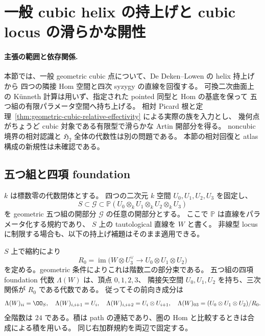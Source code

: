 \section{一般 cubic helix の持上げと cubic locus の滑らかな開性}
\label{sec:cubic-smooth-atlas}

\paragraph{主張の範囲と依存関係.}
本節では、一般 geometric cubic 点について、De Deken--Lowen の helix 持上げから
四つの隣接 Hom 空間と四次 syzygy の直線を回復する。
可換二次曲面上の Künneth 計算は用いず、指定された pointed 同型と Hom の基底を保って
五つ組の有限パラメータ空間へ持ち上げる。
相対 Picard 根と定理~\ref{thm:geometric-cubic-relative-effectivity} による実際の族を入力とし、
幾何点がちょうど cubic 対象である有限型で滑らかな Artin 開部分を得る。
noncubic 境界の相対認識と $\mathfrak H_2$ 全体の代数性は別の問題である。
本節の相対回復と atlas 構成の新規性は未確認である。

\subsection{五つ組と四項 foundation}

$k$ は標数零の代数閉体とする。
四つの二次元 $k$ 空間 $U_0,U_1,U_2,U_3$ を固定し、
\[
 S\subset\mathscr G\subset
 \mathbb P(U_0\otimes_kU_1\otimes_kU_2\otimes_kU_3)
\]
を geometric 五つ組の開部分 $\mathscr G$ の任意の開部分とする。
ここで $\mathbb P$ は直線をパラメータ化する規約であり、
$S$ 上の tautological 直線を $W$ と書く。
非線型 locus に制限する場合も、以下の持上げ補題はそのまま適用できる。

$S$ 上で縮約により
\[
 R_0=\operatorname{im}
 \bigl(W\otimes U_3^\vee\longrightarrow U_0\otimes U_1\otimes U_2\bigr)
\]
を定める。geometric 条件によりこれは階数二の部分束である。
五つ組の四項 foundation 代数 $\Lambda(W)$ は、頂点 $0,1,2,3$、
隣接矢空間 $U_0,U_1,U_2$ を持ち、三次関係が $R_0$ である代数である。
従ってその前向き成分は
\[
 \Lambda(W)_{ii}=\OO_S,\quad
 \Lambda(W)_{i,i+1}=U_i,\quad
 \Lambda(W)_{i,i+2}=U_i\otimes U_{i+1},\quad
 \Lambda(W)_{03}=(U_0\otimes U_1\otimes U_2)/R_0.
\]
全階数は $24$ である。積は path の連結であり、圏の Hom と比較するときは合成による積を用いる。
同じ右加群規約を両辺で固定する。

